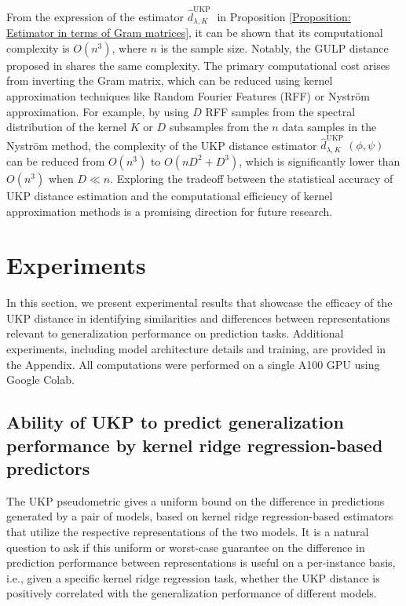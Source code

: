 \documentclass{article}
\theoremstyle{plain}
\newcommand{\metricstname}{UKP }
\begin{document}
From the expression of the estimator $\hat{d}_{\lambda,K}^{\text{\metricstname}}$ in Proposition \ref{Proposition: Estimator in terms of Gram matrices}, it can be shown that its computational complexity is $O(n^3)$, where $n$ is the sample size. Notably, the GULP distance proposed in \citet{GULP} shares the same complexity. The primary computational cost arises from inverting the Gram matrix, which can be reduced using kernel approximation techniques like Random Fourier Features (RFF) or Nystr\"{o}m approximation. For example, by using $D$ RFF samples from the spectral distribution of the kernel $K$ or $D$ subsamples from the $n$ data samples in the Nystr\"{o}m method, the complexity of the UKP distance estimator $\hat{d}_{\lambda,K}^{\text{\metricstname}}(\phi,\psi)$ can be reduced from $O(n^3)$ to $O(nD^{2} + D^{3})$, which is significantly lower than $O(n^3)$ when $D \ll n$. Exploring the tradeoff between the statistical accuracy of \metricstname distance estimation and the computational efficiency of kernel approximation methods is a promising direction for future research.

\section{Experiments} \label{experiments}
 
 In this section, we present experimental results that showcase the efficacy of the \metricstname distance in identifying similarities and differences between representations relevant to generalization performance on prediction tasks. Additional experiments, including model architecture details and training, are provided in the Appendix. All computations were performed on a single A100 GPU using Google Colab.

\subsection{Ability of \metricstname to predict generalization performance by kernel ridge regression-based predictors} \label{MNIST experiments}
The \metricstname pseudometric gives a uniform bound on the difference in predictions generated by a pair of models, based on kernel ridge regression-based estimators that utilize the respective representations of the two models. It is a natural question to ask if this uniform or worst-case guarantee on the difference in prediction performance between representations is useful on a per-instance basis, i.e., given a specific kernel ridge regression task, whether the \metricstname distance is positively correlated with the generalization performance of different models.
\end{document}

